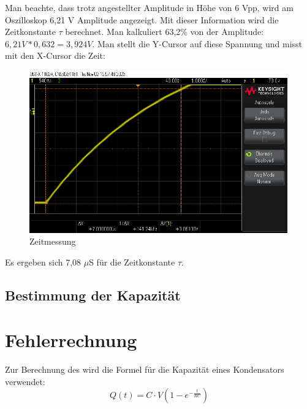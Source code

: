 Man beachte, dass trotz angestellter Amplitude in Höhe von
6 Vpp, wird am Oszilloskop 6,21 V Amplitude angezeigt. Mit dieser 
Information wird die Zeitkonstante $\tau$ berechnet. Man kalkuliert
63,2\% von der Amplitude: $6,21V * 0,632 = 3,924V$. Man stellt die 
Y-Cursor auf diese Spannung und misst mit den X-Cursor die Zeit:
\begin{figure}[H]
	\centering
	\includegraphics[height=7cm]{images/Versuch1/Zeitmessung.png} 
	\caption{Zeitmessung}
	\label{fig: Zeitmessung}
\end{figure}

Es ergeben sich 7,08 $\mu$S für die Zeitkonstante $\tau$. 

\subsection{Bestimmung der Kapazität}



\section{Fehlerrechnung}


Zur Berechnung des wird die Formel für die Kapazität eines Kondensators verwendet:
\begin{equation}
    Q(t) = C \cdot V \left(1 - e^{-\frac{t}{RC}}\right)
\end{equation}
